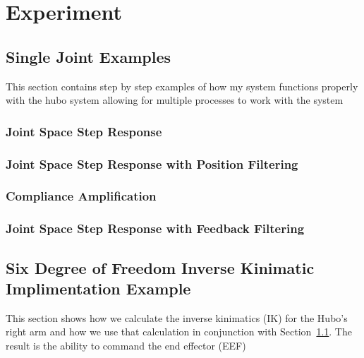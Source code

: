 \chapter{Experiment}
\section{Single Joint Examples}\label{sec:simpleExamples}
This section contains step by step examples of how my system functions properly with the hubo system allowing for multiple processes to work with the system

	\subsection{Joint Space Step Response}\label{sec:singlejointStep}
		
	\subsection{Joint Space Step Response with Position Filtering}\label{sec:singlejointFilter}
		
	\subsection{Compliance Amplification}\label{sec:singlejointRefComplience}
		
	\subsection{Joint Space Step Response with Feedback Filtering}\label{sec:singlejointEnc}
		
\section{Six Degree of Freedom Inverse Kinimatic Implimentation Example}\label{sec:6dofik}
This section shows how we calculate the inverse kinimatics (IK) for the Hubo's right arm and how we use that calculation in conjunction with Section~\ref{sec:simpleExamples}.  The result is the ability to command the end effector (EEF)
%		

